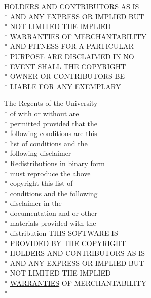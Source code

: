 \begin{DoxyCompactItemize}
H\+O\+L\+D\+E\+R\+S A\+N\+D C\+O\+N\+T\+R\+I\+B\+U\+T\+O\+R\+S A\+S I\+S \\*
A\+N\+D A\+N\+Y E\+X\+P\+R\+E\+S\+S O\+R I\+M\+P\+L\+I\+E\+D B\+U\+T \\*
N\+O\+T L\+I\+M\+I\+T\+E\+D T\+H\+E I\+M\+P\+L\+I\+E\+D \\*
\hyperlink{_l_i_c_e_n_s_e_a3f8645b457d8bdef4fd7c3549fc01039}{W\+A\+R\+R\+A\+N\+T\+I\+E\+S} O\+F M\+E\+R\+C\+H\+A\+N\+T\+A\+B\+I\+L\+I\+T\+Y \\*
A\+N\+D F\+I\+T\+N\+E\+S\+S F\+O\+R A P\+A\+R\+T\+I\+C\+U\+L\+A\+R \\*
P\+U\+R\+P\+O\+S\+E A\+R\+E D\+I\+S\+C\+L\+A\+I\+M\+E\+D I\+N N\+O \\*
E\+V\+E\+N\+T S\+H\+A\+L\+L T\+H\+E C\+O\+P\+Y\+R\+I\+G\+H\+T \\*
O\+W\+N\+E\+R O\+R C\+O\+N\+T\+R\+I\+B\+U\+T\+O\+R\+S B\+E \\*
L\+I\+A\+B\+L\+E F\+O\+R A\+N\+Y \hyperlink{_l_i_c_e_n_s_e_aa78b67dcb774d1c903a69fc502d9486e}{E\+X\+E\+M\+P\+L\+A\+R\+Y}
\item 
The Regents of the University \\*
of with or without are \\*
permitted provided that the \\*
following conditions are this \\*
list of conditions and the \\*
following disclaimer \\*
Redistributions in binary form \\*
must reproduce the above \\*
copyright this list of \\*
conditions and the following \\*
disclaimer in the \\*
documentation and or other \\*
materials provided with the \\*
distribution T\+H\+I\+S S\+O\+F\+T\+W\+A\+R\+E I\+S \\*
P\+R\+O\+V\+I\+D\+E\+D B\+Y T\+H\+E C\+O\+P\+Y\+R\+I\+G\+H\+T \\*
H\+O\+L\+D\+E\+R\+S A\+N\+D C\+O\+N\+T\+R\+I\+B\+U\+T\+O\+R\+S A\+S I\+S \\*
A\+N\+D A\+N\+Y E\+X\+P\+R\+E\+S\+S O\+R I\+M\+P\+L\+I\+E\+D B\+U\+T \\*
N\+O\+T L\+I\+M\+I\+T\+E\+D T\+H\+E I\+M\+P\+L\+I\+E\+D \\*
\hyperlink{_l_i_c_e_n_s_e_a3f8645b457d8bdef4fd7c3549fc01039}{W\+A\+R\+R\+A\+N\+T\+I\+E\+S} O\+F M\+E\+R\+C\+H\+A\+N\+T\+A\+B\+I\+L\+I\+T\+Y \\*

\end{DoxyCompactItemize}
